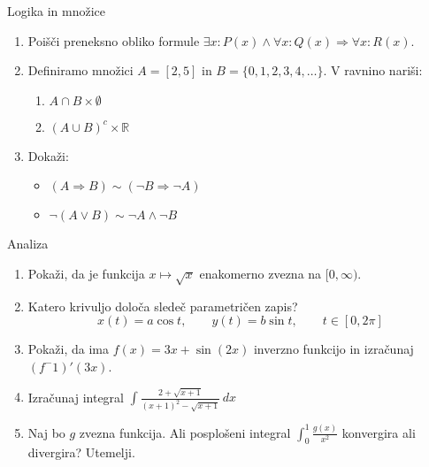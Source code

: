 \begin{frame}{Logika in množice}
	\begin{enumerate}
		\item
		Poišči preneksno obliko formule $\exists x : P(x) \land \forall x : Q(x) \Rightarrow \forall x : R(x)$.
		\item 
		Definiramo množici $A = [2,5]$ in $B = \{0,1,2,3,4, \ldots\}$.
		V ravnino nariši:
		\begin{enumerate}
		   \item $A \cap B \times \emptyset$
		   \item $(A \cup B)^c \times \mathbb{R}$
		\end{enumerate}
		\item
		Dokaži:
		\begin{itemize}
			\item $(A \Rightarrow B) \sim (\neg B \Rightarrow \neg A)$
			\item $\neg(A \lor B) \sim \neg A \land \neg B$
		\end{itemize}
	\end{enumerate}
\end{frame}



\begin{frame}{Analiza}
	\begin{enumerate}
		\item
		Pokaži, da je funkcija $x \mapsto\sqrt{x}$ enakomerno zvezna na $[0,\infty)$.
		\item 
		Katero krivuljo določa sledeč parametričen zapis?
		$$
		   x(t) = a \cos t, \qquad %
		   y(t) = b \sin t, \qquad %
		   t \in [0, 2 \pi]
		$$ 
		\item
		Pokaži, da ima $f(x)=3x + \sin(2x)$ inverzno funkcijo in izračunaj $(f^-1)'(3x)$.
		
		\item
		Izračunaj integral 
		$ \displaystyle{\int \frac{2+\sqrt{x+1}}{(x+1)^2-\sqrt{x+1}}} \,dx $
		\item 
		Naj bo $g$ zvezna funkcija. Ali posplošeni integral 
		$\int_{0}^{1} \frac{g(x)}{x^2}$
		konvergira ali divergira? Utemelji.
	\end{enumerate}
\end{frame}

